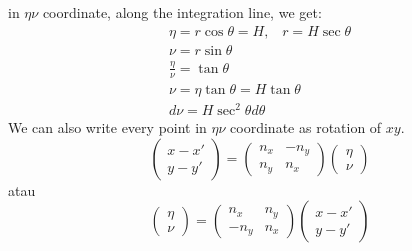\documentclass[a4paper,12pt]{article}
\begin{document}
in $\eta\nu$ coordinate, along the integration line, we get:
\begin{align}
 \eta=r \cos \theta=H\text{,}  \quad r=H\sec\theta\\
\nu= r\sin \theta\\
\frac{\eta}{\nu}= \tan\theta\\
\nu=\eta \tan \theta=H\tan \theta\\
d\nu=H \sec^2\theta d\theta
\end{align}
We can also write every point in  $\eta\nu$ coordinate as rotation of $xy$.
\begin{equation}
\left(\begin{array}{c}
      x-x' \\
      y-y'
    \end{array}\right)=\left(\begin{array}{cc}
      n_x & -n_y \\
      n_y & n_x
    \end{array}\right)\left(\begin{array}{c}
      \eta\\
      \nu
    \end{array}\right) \label{RotasixNu}
\end{equation}
atau
\begin{equation}
\left(\begin{array}{c}
    \eta   \\
     \nu 
    \end{array}\right)=\left(\begin{array}{cc}
      n_x & n_y \\
      -n_y & n_x
    \end{array}\right)\left(\begin{array}{c}
      x-x'\\
     y-y'
    \end{array}\right) 
\end{equation}
\end{document}

